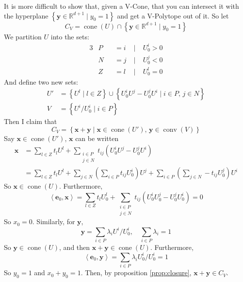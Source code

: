 \documentclass[fleqn]{article}
\renewcommand{\vec}[1]{\mathbf{#1}}
\newcommand{\set}[1]{\left\{#1\right\}}
\DeclareMathOperator{\cone}{cone}
\DeclareMathOperator{\conv}{conv}
\newcommand{\ip}[2]{\left\langle #1, #2 \right\rangle}
\newcommand{\R}{\mathbb{R}}
\newcommand{\0}{\vec{0}}
\newcommand{\x}{\vec{x}}
\newcommand{\y}{\vec{y}}
\newcommand{\e}{\vec{e}}
\newcommand{\st}{\;|\;}
\newcommand{\yv}{\y \in \R^{d+1}}
\newcommand{\Uiz}{U^i_{0}}
\newcommand{\Ujz}{U^j_{0}}
\newcommand{\Ulz}{U^l_{0}}
\newcommand{\Psum}{\sum_{i\in P}}
\newcommand{\Nsum}{\sum_{j\in N}}
\newcommand{\NPsum}{\sum_{\substack{i\in P \\ j\in N}}}
\begin{document}
It is more difficult to show that, given a V-Cone, that you can intersect it with the hyperplane $\set{\yv \st y_0 = 1}$ and get a V-Polytope out of it.  So let
  \[ C_V = \cone(U) \cap \set{\yv \st y_0 = 1} \]
We partition $U$ into the sets:
  \begin{alignat*}{3}
  &P &&= i &\st &\Uiz > 0 \\
  &N &&= j &\st &\Ujz < 0 \\
  &Z &&= l &\st &\Ulz = 0
  \end{alignat*}
And define two new sets:
\begin{align*} 
  U'  &= \set{U^l \st l \in Z} \cup \set{\Uiz U^j - \Ujz U^i \st i\in P,\, j\in N} \\
  V\; &= \set{U^i/\Uiz \st i \in P}
\end{align*}
Then I claim that
\begin{equation}\label{eq:cvtopv}
  C_V = \set{\x + \y \st \x\in\cone(U'),\, \y\in\conv(V)}
\end{equation}
Say $\x \in\cone(U')$, $\x$ can be written
\begin{align*}
\x &= \sum_{l\in Z}t_l U^l + \NPsum t_{ij}(\Uiz U^j - \Ujz U^i) \\
   &= \sum_{l\in Z}t_l U^l + \Nsum \left(\Psum t_{ij}\Uiz\right) U^j
                             + \Psum \left(\Nsum -t_{ij}\Ujz\right) U^i
\end{align*}
So $\x \in \cone(U)$.  Furthermore,
\[ \ip{\e_0}{\x} = \sum_{l\in Z}t_l \Ulz + \NPsum t_{ij}(\Uiz \Ujz - \Ujz \Uiz) = 0\]
So $x_0 = 0$.  Similarly, for $\y$,
\[ \y = \Psum \lambda_i U^i/\Uiz,\quad\Psum\lambda_i = 1 \]
So $\y \in \cone(U)$, and then $\x + \y \in \cone(U)$.  Furthermore,
\[ \ip{\e_0}{\y} = \Psum \lambda_i \Uiz/\Uiz = 1\]
So $y_0 = 1$ and $x_0 + y_0 = 1$.  Then, by proposition \ref{prop:closure}, $\x + \y \in C_V$.
\end{document}
